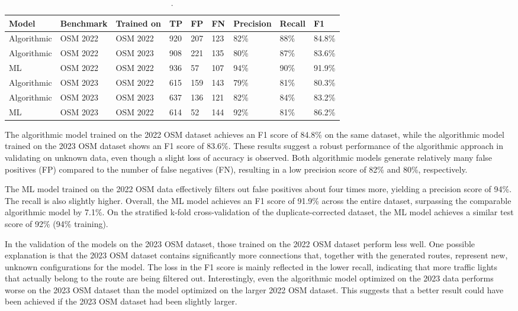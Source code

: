 \begin{table}[h]
\caption{.}
\begin{tabular}{@{}lllllllll@{}}
\toprule
  \textbf{Model} & \textbf{Benchmark} & \textbf{Trained on} & \textbf{TP} & \textbf{FP} & \textbf{FN} & \textbf{Precision} & \textbf{Recall} & \textbf{F1} \\
  \midrule
  Algorithmic & OSM 2022 & OSM 2022 & 920 & 207 & 123 & 82\% & 88\% & 84.8\% \\
  Algorithmic & OSM 2022 & OSM 2023 & 908 & 221 & 135 & 80\% & 87\% & 83.6\% \\
  ML          & OSM 2022 & OSM 2022 & 936 & 57 & 107 & 94\% & 90\% & 91.9\% \\
  \midrule
  Algorithmic & OSM 2023 & OSM 2022 & 615 & 159 & 143 & 79\% & 81\% & 80.3\% \\
  Algorithmic & OSM 2023 & OSM 2023 & 637 & 136 & 121 & 82\% & 84\% & 83.2\% \\
  ML          & OSM 2023 & OSM 2022 & 614 & 52 & 144 & 92\% & 81\% & 86.2\% \\
\bottomrule
\end{tabular}
\label{tab:model-scores}
\end{table}

The algorithmic model trained on the 2022 OSM dataset achieves an F1 score of 84.8\% on the same dataset, while the algorithmic model trained on the 2023 OSM dataset shows an F1 score of 83.6\%. These results suggest a robust performance of the algorithmic approach in validating on unknown data, even though a slight loss of accuracy is observed. Both algorithmic models generate relatively many false positives (FP) compared to the number of false negatives (FN), resulting in a low precision score of 82\% and 80\%, respectively.

The ML model trained on the 2022 OSM data effectively filters out false positives about four times more, yielding a precision score of 94\%. The recall is also slightly higher. Overall, the ML model achieves an F1 score of 91.9\% across the entire dataset, surpassing the comparable algorithmic model by 7.1\%. On the stratified k-fold cross-validation of the duplicate-corrected dataset, the ML model achieves a similar test score of 92\% (94\% training).

In the validation of the models on the 2023 OSM dataset, those trained on the 2022 OSM dataset perform less well. One possible explanation is that the 2023 OSM dataset contains significantly more connections that, together with the generated routes, represent new, unknown configurations for the model. The loss in the F1 score is mainly reflected in the lower recall, indicating that more traffic lights that actually belong to the route are being filtered out. Interestingly, even the algorithmic model optimized on the 2023 data performs worse on the 2023 OSM dataset than the model optimized on the larger 2022 OSM dataset. This suggests that a better result could have been achieved if the 2023 OSM dataset had been slightly larger.

